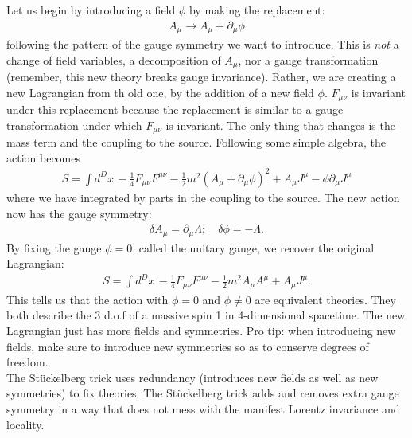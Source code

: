 \documentclass{book}
\theoremstyle{definition}
\newcommand{\p}{\partial}
\newcommand{\f}[2]{\frac{#1}{#2}}
\newcommand{\lp}{\left(}
\newcommand{\rp}{\right)}
\begin{document}
Let us begin by introducing  a field $\phi$ by making the replacement:
\begin{align}
A_\mu \to A_\mu + \p_\mu \phi
\end{align}
following the pattern of the gauge symmetry we want to introduce. This is \textit{not} a change of field variables, a decomposition of $A_\mu$, nor a gauge transformation (remember, this new theory breaks gauge invariance). Rather, we are creating a new Lagrangian from th old one, by the addition of a new field $\phi$. $F_{\mu\nu}$ is invariant under this replacement because the replacement is similar to a gauge transformation under which $F_{\mu\nu}$ is invariant. The only thing that changes is the mass term and the coupling to the source. Following some simple algebra, the action becomes
\begin{align}
S = \int d^Dx\, -\f{1}{4}F_{\mu\nu}F^{\mu\nu} -\f{1}{2}m^2\lp A_\mu + \p_\mu \phi \rp^2 + A_\mu J^\mu - \phi \p_\mu J^\mu
\end{align} 
where we have integrated by parts in the coupling to the source. The new action now has the gauge symmetry:
\begin{align}
\delta A_\mu = \p_\mu \Lambda; \quad \delta \phi = -\Lambda.
\end{align}
By fixing the gauge $\phi = 0$, called the unitary gauge, we recover the original Lagrangian:
\begin{align}
S = \int d^Dx\, -\f{1}{4}F_{\mu\nu}F^{\mu\nu} - \f{1}{2}m^2 A_\mu A^\mu + A_\mu J^\mu.
\end{align}
This tells us that the action with $\phi = 0$ and $\phi \neq 0$ are equivalent theories. They both describe the 3 d.o.f of a massive spin 1 in 4-dimensional spacetime. The new Lagrangian just has more fields and symmetries. Pro tip: when introducing new fields, make sure to introduce new symmetries so as to conserve degrees of freedom. \\

The St\"{u}ckelberg trick uses redundancy (introduces new fields as well as new symmetries) to fix theories. The St\"{u}ckelberg trick adds and removes extra gauge symmetry in a way that does not mess with the manifest Lorentz invariance and locality. \\
\end{document}
